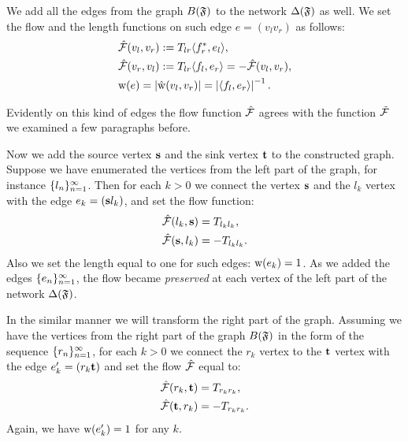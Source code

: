 \documentclass[12pt]{article}
\begin{document}
    We add all the edges from the graph $B(\mathfrak{F})$ to the network $\Delta(\mathfrak{F})$ as well.
    We set the flow and the length functions on such edge $e = (v_l v_r)$ as follows:
    \begin{align*}
      &\mathcal{\hat{F}}(v_l, v_r) := T_{lr} \langle f^*_r, e_l \rangle,\\
      &\mathcal{\hat{F}}(v_r, v_l) := T_{lr} \langle f_l, e_r \rangle = -\mathcal{\hat{F}}(v_l, v_r),\\
      &\mathrm{w}(e) = \left| \mathrm{\hat{w}}(v_l, v_r) \right| =  \left|\langle f_l, e_r \rangle\right|^{-1}.
    \end{align*}
    \begin{note}
      Evidently on this kind of edges the flow function $\mathcal{\hat{F}}$ agrees with the function $\mathcal{\tilde{F}}$
        we examined a few paragraphs before.
    \end{note}

    Now we add the source vertex $\mathbf{s}$ and the sink vertex $\mathbf{t}$ to the constructed graph.
    Suppose we have enumerated the vertices from the left part of the graph, for instance $\{{l}_n\}_{n=1}^\infty$.
    Then for each $k > 0$ we connect the vertex $\mathbf{s}$ and the $l_k$ vertex with
      the edge $e_k = (\mathbf{s} l_k)$, and set the flow function:
    \begin{align*}
      &\mathcal{\hat{F}}(l_k, \mathbf{s}) = T_{l_k l_k},\\
      &\mathcal{\hat{F}}(\mathbf{s}, l_k) = -T_{l_k l_k}.
    \end{align*}
    Also we set the length equal to one for such edges: $\mathrm{w}(e_k) = 1$.
    As we added the edges $\{{e}_n\}_{n=1}^\infty$, the flow became \emph{preserved} at each vertex of the left part of the network $\Delta(\mathfrak{F})$.

    In the similar manner we will transform the right part of the graph.
    Assuming we have the vertices from the right part of the graph $B(\mathfrak{F})$ in the form of the sequence $\{{r}_n\}_{n=1}^\infty$,
      for each $k > 0$ we connect the $r_k$ vertex to the $\mathbf{t}$ vertex with the edge $e'_k=(r_k \mathbf{t})$
      and set the flow $\mathcal{\hat{F}}$ equal to:
    \begin{align*}
      &\mathcal{\hat{F}}(r_k, \mathbf{t}) = T_{r_k r_k},\\
      &\mathcal{\hat{F}}(\mathbf{t}, r_k) = -T_{r_k r_k}.
    \end{align*}
    Again, we have $\mathrm{w}(e'_k) = 1$ for any $k$.
\end{document}
